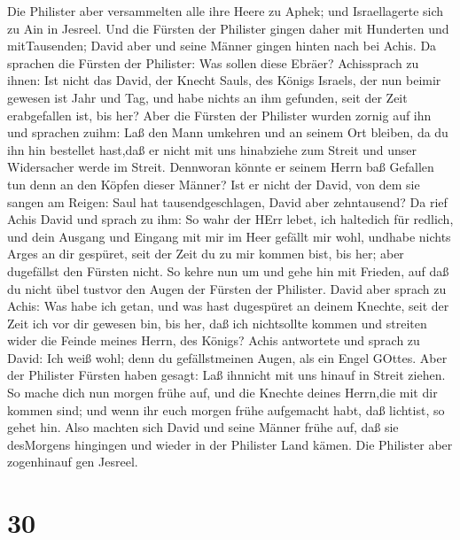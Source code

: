  Die Philister aber versammelten alle ihre Heere zu Aphek;
und Israellagerte sich zu Ain in Jesreel.  Und die Fürsten
der Philister gingen daher mit Hunderten und mitTausenden; David aber
und seine Männer gingen hinten nach bei Achis.  Da sprachen
die Fürsten der Philister: Was sollen diese Ebräer? Achissprach zu
ihnen: Ist nicht das David, der Knecht Sauls, des Königs Israels, der
nun beimir gewesen ist Jahr und Tag, und habe nichts an ihm gefunden,
seit der Zeit erabgefallen ist, bis her?  Aber die Fürsten
der Philister wurden zornig auf ihn und sprachen zuihm: Laß den Mann
umkehren und an seinem Ort bleiben, da du ihn hin bestellet hast,daß er
nicht mit uns hinabziehe zum Streit und unser Widersacher werde im
Streit. Dennworan könnte er seinem Herrn baß Gefallen tun denn an den
Köpfen dieser Männer?  Ist er nicht der David, von dem sie
sangen am Reigen: Saul hat tausendgeschlagen, David aber zehntausend?
 Da rief Achis David und sprach zu ihm: So wahr der HErr
lebet, ich haltedich für redlich, und dein Ausgang und Eingang mit mir
im Heer gefällt mir wohl, undhabe nichts Arges an dir gespüret, seit der
Zeit du zu mir kommen bist, bis her; aber dugefällst den Fürsten nicht.
 So kehre nun um und gehe hin mit Frieden, auf daß du nicht
übel tustvor den Augen der Fürsten der Philister.  David
aber sprach zu Achis: Was habe ich getan, und was hast dugespüret an
deinem Knechte, seit der Zeit ich vor dir gewesen bin, bis her, daß ich
nichtsollte kommen und streiten wider die Feinde meines Herrn, des
Königs?  Achis antwortete und sprach zu David: Ich weiß
wohl; denn du gefällstmeinen Augen, als ein Engel GOttes. Aber der
Philister Fürsten haben gesagt: Laß ihnnicht mit uns hinauf in Streit
ziehen.  So mache dich nun morgen frühe auf, und die
Knechte deines Herrn,die mit dir kommen sind; und wenn ihr euch morgen
frühe aufgemacht habt, daß lichtist, so gehet hin.  Also
machten sich David und seine Männer frühe auf, daß sie desMorgens
hingingen und wieder in der Philister Land kämen. Die Philister aber
zogenhinauf gen Jesreel.

\hypertarget{section-29}{%
\section{30}\label{section-29}}


